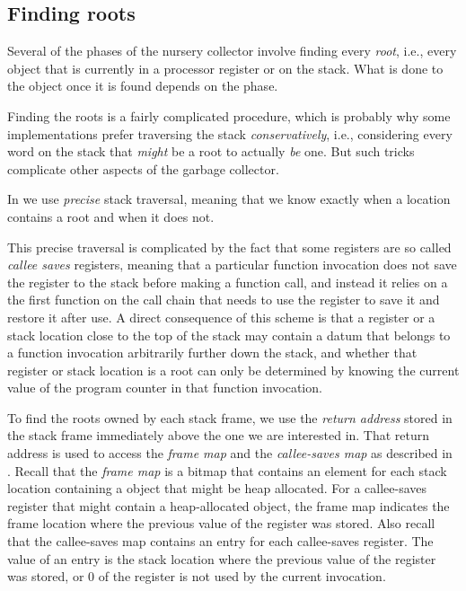 \subsection{Finding roots}
\label{sec-garbage-collection-finding-roots}

Several of the phases of the nursery collector involve finding every
\emph{root}, i.e., every \commonlisp{} object that is currently in a
processor register or on the stack.  What is done to the object once
it is found depends on the phase.

Finding the roots is a fairly complicated procedure, which is probably
why some implementations prefer traversing the stack
\emph{conservatively}, i.e., considering every word on the stack that
\emph{might} be a root to actually \emph{be} one.  But such tricks
complicate other aspects of the garbage collector.

In \sysname{} we use \emph{precise} stack traversal, meaning that we
know exactly when a location contains a root and when it does not.

This precise traversal is complicated by the fact that some registers
are so called \emph{callee saves} registers, meaning that a particular
function invocation does not save the register to the stack before
making a function call, and instead it relies on a the first function
on the call chain that needs to use the register to save it and
restore it after use.  A direct consequence of this scheme is that a
register or a stack location close to the top of the stack may contain
a datum that belongs to a function invocation arbitrarily further down
the stack, and whether that register or stack location is a root can
only be determined by knowing the current value of the program counter
in that function invocation.

To find the roots owned by each stack frame, we use the \emph{return
  address} stored in the stack frame immediately above the one we are
interested in.  That return address is used to access the \emph{frame
  map} and the \emph{callee-saves map} as described in
.  Recall that the
\emph{frame map} is a bitmap that contains an element for each stack
location containing a \commonlisp{} object that might be heap
allocated.  For a callee-saves register that might contain a
heap-allocated \commonlisp{} object, the frame map indicates the frame
location where the previous value of the register was stored.  Also
recall that the callee-saves map contains an entry for each
callee-saves register.  The value of an entry is the stack location
where the previous value of the register was stored, or $0$ of the
register is not used by the current invocation.

